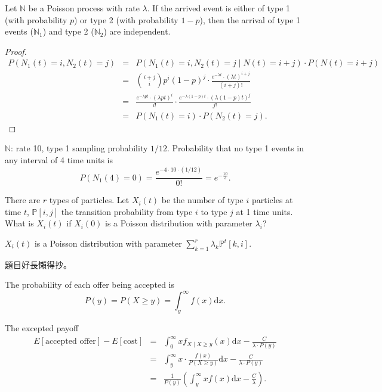\begin{properity}
Let $ \mathbb{N} $ be a Poisson process with rate $ \lambda $. If the arrived event is either of type 1 (with probability $ p $) or type 2 (with probability $ 1 - p $), then the arrival of type 1 events ($ \mathbb{N}_{1} $) and type 2 ($ \mathbb{N}_{2} $) are independent.
\begin{proof}
\begin{eqnarray*}
P(N_{1}(t) = i, N_{2}(t) = j)
  & = & P(N_{1}(t) = i, N_{2}(t) = j \mid N(t) = i + j) \cdot P(N(t) = i + j) \\
  & = & {{i + j}\choose{i}} p^{i} (1 - p)^{j} \cdot \frac{e^{-\lambda t} \cdot (\lambda t)^{i + j}}{(i + j)!} \\
  & = & \frac{e^{-\lambda p t} \cdot (\lambda p t)^{i}}{i!} \cdot \frac{e^{-\lambda (1 - p) t} \cdot (\lambda (1 - p) t)^{j}}{j!} \\
  & = & P(N_{1}(t) = i) \cdot P(N_{2}(t) = j).
\end{eqnarray*}
\end{proof}
\end{properity}

\begin{example}
$ \mathbb{N} $: rate 10, type 1 sampling probability $ 1 / 12 $.
Probability that no type 1 events in any interval of 4 time units is
\[ P(N_{1}(4) = 0) = \frac{e^{-4 \cdot 10 \cdot (1 / 12)}}{0!} = e^{-\frac{10}{3}}. \]
\end{example}

\begin{example}
There are $ r $ types of particles. Let $ X_{i}(t) $ be the number of type $ i $ particles at time $ t $, $ \mathbb{P}[i, j] $ the transition probability from type $ i $ to type $ j $ at 1 time units. What is $ X_{i}(t) $ if $ X_{i}(0) $ is a Poisson distribution with parameter $ \lambda_{i} $?

$ X_{i}(t) $ is a Poisson distribution with parameter $ \sum_{k = 1}^{r} \lambda_{k}\mathbb{P}^{t}[k, i]. $
\begin{comment}
$ \lambda_{k}\mathbb{P}^{t}[k, i] $ 為時間 0 為 type $ k $，到時間 $ t $ 變成 type $ i $ 的個數（是一個 Poisson distribution）的參數。
\end{comment}
\end{example}

\begin{example}
題目好長懶得抄。

The probability of each offer being accepted is
\[ P(y) = P(X \ge y) = \int_{y}^{\infty} f(x) \mathrm{d}x. \]

The excepted payoff
\begin{eqnarray*}
E[\text{accepted offer}] - E[\text{cost}]
  & = & \int_{0}^{\infty} xf_{X \mid X \ge y}(x) \mathrm{d}x - \frac{C}{\lambda \cdot P(y)} \\
  & = & \int_{y}^{\infty} x \cdot \frac{f(x)}{P(X \ge y)} \mathrm{d}x - \frac{C}{\lambda \cdot P(y)} \\
  & = & \frac{1}{P(y)} \left( \int_{y}^{\infty} xf(x) \mathrm{d}x - \frac{C}{\lambda} \right).
\end{eqnarray*}
\end{example}

